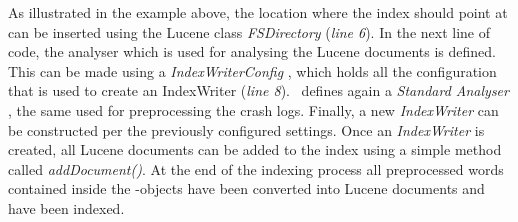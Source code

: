 As illustrated in the example above, the location where the index should point at can be inserted using the Lucene class \textit{FSDirectory} \cite{lucenefsdir} (\textit{line 6}). %
In the next line of code, the analyser which is used for analysing the Lucene documents is defined. 
This can be made using a \textit{IndexWriterConfig} \cite{luceneindexwriterconfig}, which holds all the configuration that is used to create an IndexWriter (\textit{line 8}). 
\toolname\ defines again a \textit{Standard Analyser} \cite{lucenestandardanalyser}, the same used for preprocessing the crash logs.
Finally, a new \textit{IndexWriter} can be constructed per the previously configured settings. 
Once an \textit{IndexWriter} is created, all Lucene documents can be added to the index using a simple method called \textit{addDocument()}. At the end of the indexing process all preprocessed words contained inside the \Crash-objects have been converted into Lucene documents and have been indexed.


